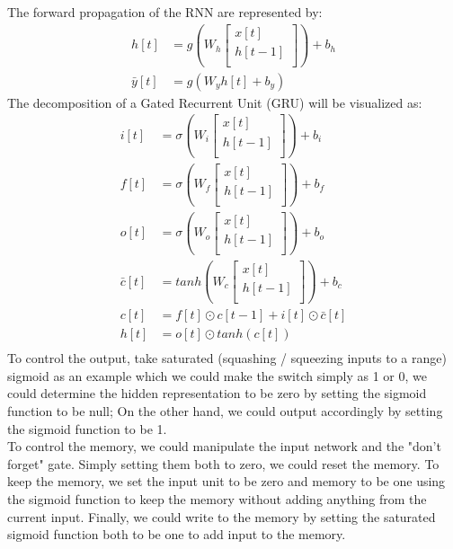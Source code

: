 The forward propagation of the RNN are represented by:\\
\begin{align*}
    h[t] & = g(W_{h} \begin{bmatrix}
        x[t] \\
        h[t - 1] \\
    \end{bmatrix}) + b_{h}\\
    \bar{y}[t] & = g(W_{y}h[t] + b_{y})
\end{align*}
The decomposition of a Gated Recurrent Unit (GRU) will be visualized as:\\
\begin{align*}
i[t] & = \sigma(W_{i} \begin{bmatrix} x[t] \\ h[t - 1] \\ \end{bmatrix}) + b_{i}\\
f[t] & = \sigma(W_{f} \begin{bmatrix} x[t] \\ h[t - 1] \\ \end{bmatrix}) + b_{f}\\ 
o[t] & = \sigma(W_{o} \begin{bmatrix} x[t] \\ h[t - 1] \\ \end{bmatrix}) + b_{o}\\
\bar{c}[t] & = tanh(W_{c} \begin{bmatrix} x[t] \\ h[t - 1] \\ \end{bmatrix}) + b_{c}\\
c[t] & = f[t] \odot c[t-1] + i[t] \odot \bar{c}[t]\\
h[t] & = o[t] \odot tanh(c[t])\\
\end{align*}
To control the output, take saturated (squashing / squeezing inputs to a range) sigmoid as an example which we could make the switch simply as 1 or 0, we could determine the hidden representation to be zero by setting the sigmoid function to be null; On the other hand, we could output accordingly by setting the sigmoid function to be 1.\\

To control the memory, we could manipulate the input network and the "don't forget" gate. Simply setting them both to zero, we could reset the memory. To keep the memory, we set the input unit to be zero and memory to be one using the sigmoid function to keep the memory without adding anything from the current input. Finally, we could write to the memory by setting the saturated sigmoid function both to be one to add input to the memory.\\

